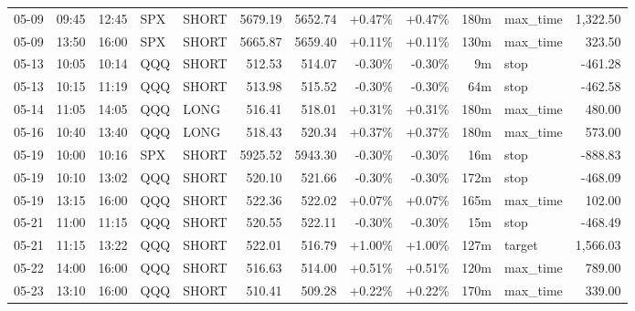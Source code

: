 \documentclass[11pt,a4paper,twoside]{article}
\begin{document}
\begin{center}
\begin{longtable}{>{\color{txtmain}}l l l l l r r r r r >{\color{txtmain}}l r}
05-09 & 09:45 & 12:45 & SPX & SHORT & 5679.19 & 5652.74 & \textcolor{wingreen}{+0.47\%} & \textcolor{wingreen}{+0.47\%} & 180m & max\_time & \textcolor{wingreen}{1,322.50} \\
05-09 & 13:50 & 16:00 & SPX & SHORT & 5665.87 & 5659.40 & \textcolor{wingreen}{+0.11\%} & \textcolor{wingreen}{+0.11\%} & 130m & max\_time & \textcolor{wingreen}{323.50} \\
05-13 & 10:05 & 10:14 & QQQ & SHORT & 512.53 & 514.07 & \textcolor{lossred}{-0.30\%} & \textcolor{lossred}{-0.30\%} & 9m & stop & \textcolor{lossred}{-461.28} \\
05-13 & 10:15 & 11:19 & QQQ & SHORT & 513.98 & 515.52 & \textcolor{lossred}{-0.30\%} & \textcolor{lossred}{-0.30\%} & 64m & stop & \textcolor{lossred}{-462.58} \\
05-14 & 11:05 & 14:05 & QQQ & LONG & 516.41 & 518.01 & \textcolor{wingreen}{+0.31\%} & \textcolor{wingreen}{+0.31\%} & 180m & max\_time & \textcolor{wingreen}{480.00} \\
05-16 & 10:40 & 13:40 & QQQ & LONG & 518.43 & 520.34 & \textcolor{wingreen}{+0.37\%} & \textcolor{wingreen}{+0.37\%} & 180m & max\_time & \textcolor{wingreen}{573.00} \\
05-19 & 10:00 & 10:16 & SPX & SHORT & 5925.52 & 5943.30 & \textcolor{lossred}{-0.30\%} & \textcolor{lossred}{-0.30\%} & 16m & stop & \textcolor{lossred}{-888.83} \\
05-19 & 10:10 & 13:02 & QQQ & SHORT & 520.10 & 521.66 & \textcolor{lossred}{-0.30\%} & \textcolor{lossred}{-0.30\%} & 172m & stop & \textcolor{lossred}{-468.09} \\
05-19 & 13:15 & 16:00 & QQQ & SHORT & 522.36 & 522.02 & \textcolor{wingreen}{+0.07\%} & \textcolor{wingreen}{+0.07\%} & 165m & max\_time & \textcolor{wingreen}{102.00} \\
05-21 & 11:00 & 11:15 & QQQ & SHORT & 520.55 & 522.11 & \textcolor{lossred}{-0.30\%} & \textcolor{lossred}{-0.30\%} & 15m & stop & \textcolor{lossred}{-468.49} \\
05-21 & 11:15 & 13:22 & QQQ & SHORT & 522.01 & 516.79 & \textcolor{wingreen}{+1.00\%} & \textcolor{wingreen}{+1.00\%} & 127m & target & \textcolor{wingreen}{1,566.03} \\
05-22 & 14:00 & 16:00 & QQQ & SHORT & 516.63 & 514.00 & \textcolor{wingreen}{+0.51\%} & \textcolor{wingreen}{+0.51\%} & 120m & max\_time & \textcolor{wingreen}{789.00} \\
05-23 & 13:10 & 16:00 & QQQ & SHORT & 510.41 & 509.28 & \textcolor{wingreen}{+0.22\%} & \textcolor{wingreen}{+0.22\%} & 170m & max\_time & \textcolor{wingreen}{339.00} \\

\end{longtable}
\end{center}
\end{document}
